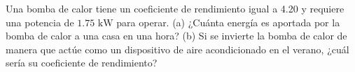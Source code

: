 \item Una bomba de calor tiene un coeficiente de rendimiento igual a 4.20 y requiere una potencia de $1.75\text{ kW}$ para operar. (a) ¿Cuánta energía es aportada por la bomba de calor a una casa en una hora? (b) Si se invierte la bomba de calor de manera que actúe como un dispositivo de aire acondicionado en el verano, ¿cuál sería su coeficiente de rendimiento?
